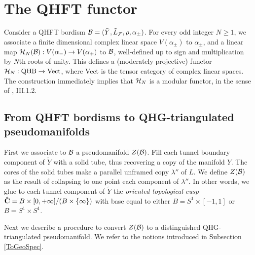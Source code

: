 \section {The QHFT functor}\label{TENSOR} Consider a QHFT bordism
${\mathcal B} =(\tilde{Y},\tilde{L}_{\mathcal F},\rho,\alpha_\pm)$. For every odd
integer $N\geq 1$, we associate a finite dimensional complex
linear space $V(\alpha_\pm)$ to $\alpha_{\pm}$, and a linear map
${\mathcal H}_N({\mathcal B}) : V(\alpha_-) \to V(\alpha_+)$ to ${\mathcal B}$, well-defined
up to sign and multiplication by $N$th roots of unity. This
defines a (moderately projective) functor ${\mathcal H}_N: {\rm QHB}
\rightarrow {\rm Vect}$, where Vect is the tensor category of
complex linear spaces. The construction immediately implies that
${\mathcal H}_N$ is a modular functor, in the sense of \cite{T}, III.1.2.

\subsection {From QHFT bordisms to QHG-triangulated pseudomanifolds}
\label{Z(B)}
First we associate to ${\mathcal B}$ a pseudomanifold $Z({\mathcal B})$.
Fill each tunnel boundary component of $\tilde{Y}$
with a solid tube, thus recovering a copy of the manifold $Y$. The
cores of the solid tubes make a parallel unframed copy $\lambda''$
of $L$. We define $Z({\mathcal B})$ as the result of collapsing to one
point each component of $\lambda''$. In other words, we glue to
each tunnel component of $\tilde{Y}$ the {\it oriented topological
cusp} $\hat{\bf C} = B \times [0,+\infty]/(B \times \{\infty\})$
with base equal to either $B=S^1\times [-1,1]$ or $B=S^1\times
S^1$.
\smallskip

Next we describe a procedure to convert $Z({\mathcal B})$ to a
distinguished QHG-triangulated pseudomanifold. We refer to the
notions introduced in Subsection \ref{ToGeoSpec}.

\smallskip

